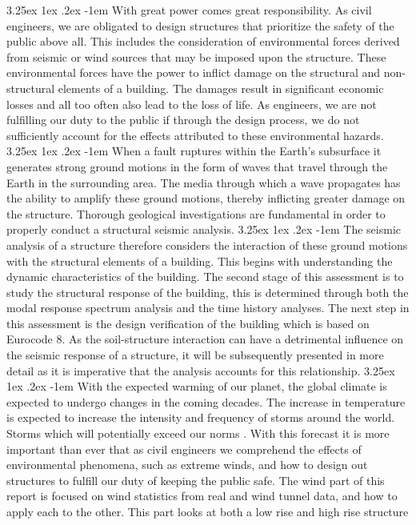 \documentclass[11pt,a4paper,titlepage]{report}
\makeatletter
\renewcommand\paragraph{\@startsection{paragraph}{5}{\z@}%
  {3.25ex \@plus1ex \@minus.2ex}%
  {-1em}%
  {\normalfont\normalsize\bfseries}}
\makeatother
\begin{document}
\paragraph{} With great power comes great responsibility. As civil engineers, we are obligated to design structures that prioritize the safety of the public above all. This includes the consideration of environmental forces derived from seismic or wind sources that may be imposed upon the structure. These environmental forces have the power to inflict damage on the structural and non-structural elements of a building. The damages result in significant economic losses and all too often also lead to the loss of life. As engineers, we are not fulfilling our duty to the public if through the design process, we do not sufficiently account for the effects attributed to these environmental hazards.
\paragraph{} When a fault ruptures within the Earth's subsurface it generates strong ground motions in the form of waves that travel through the Earth in the surrounding area. The media through which a wave propagates has the ability to amplify these ground motions, thereby inflicting greater damage on the structure. Thorough geological investigations are fundamental in order to properly conduct a structural seismic analysis. 
\paragraph{} The seismic analysis of a structure therefore considers the interaction of these ground motions with the structural elements of a building. This begins with understanding the dynamic characteristics of the building. The second stage of this assessment is to study the structural response of the building, this is determined through both the modal response spectrum analysis and the time history analyses. The next step in this assessment is the design verification of the building which is based on Eurocode 8. As the soil-structure interaction can have a detrimental influence on the seismic response of a structure, it will be subsequently presented in more detail as it is imperative that the analysis accounts for this relationship. 
\paragraph{}With the expected warming of our planet, the global climate is expected to undergo changes in the coming decades. The increase in temperature is expected to increase the intensity and frequency of storms around the world. Storms which will potentially exceed our norms \cite{Climate}. With this forecast it is more important than ever that as civil engineers we comprehend the effects of environmental phenomena, such as extreme winds, and how to design out structures to fulfill our duty of keeping the public safe. The wind part of this report is focused on wind statistics from real and wind tunnel data, and how to apply each to the other. This part looks at both a low rise and high rise structure 
\end{document}
